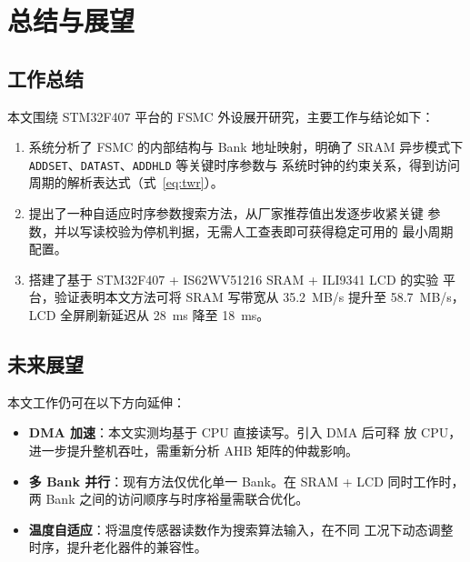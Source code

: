
\chapter{总结与展望}
\label{ch:conclusion}

\section{工作总结}
\label{sec:summary}

本文围绕 STM32F407 平台的 FSMC 外设展开研究，主要工作与结论如下：

\begin{enumerate}
    \item 系统分析了 FSMC 的内部结构与 Bank 地址映射，明确了 SRAM 异步模式下
          \texttt{ADDSET}、\texttt{DATAST}、\texttt{ADDHLD} 等关键时序参数与
          系统时钟的约束关系，得到访问周期的解析表达式（式~\ref{eq:twr}）。
    \item 提出了一种自适应时序参数搜索方法，从厂家推荐值出发逐步收紧关键
          参数，并以写读校验为停机判据，无需人工查表即可获得稳定可用的
          最小周期配置。
    \item 搭建了基于 STM32F407 + IS62WV51216 SRAM + ILI9341 LCD 的实验
          平台，验证表明本文方法可将 SRAM 写带宽从 35.2~MB/s 提升至
          58.7~MB/s，LCD 全屏刷新延迟从 28~ms 降至 18~ms。
\end{enumerate}

\section{未来展望}
\label{sec:future}

本文工作仍可在以下方向延伸：

\begin{itemize}
    \item \textbf{DMA 加速}：本文实测均基于 CPU 直接读写。引入 DMA 后可释
          放 CPU，进一步提升整机吞吐，需重新分析 AHB 矩阵的仲裁影响。
    \item \textbf{多 Bank 并行}：现有方法仅优化单一 Bank。在 SRAM + LCD
          同时工作时，两 Bank 之间的访问顺序与时序裕量需联合优化。
    \item \textbf{温度自适应}：将温度传感器读数作为搜索算法输入，在不同
          工况下动态调整时序，提升老化器件的兼容性。
\end{itemize}
